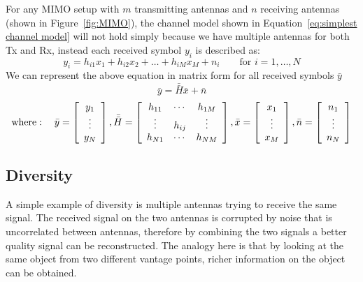 For any MIMO setup with $m$ transmitting antennas and $n$ receiving antennas (shown in Figure~\ref{fig:MIMO}), the channel model shown in Equation~\ref{eq:simplest channel model} will not hold simply because we have multiple antennas for both Tx and Rx, instead each received symbol $y_i$ is described as:
\begin{equation}
    \label{eq:y_i MIMO}
    y_i = h_{i1} x_1 + h_{i2} x_2 + \ldots + h_{iM} x_M + n_i \qquad \text{for } i=1,\ldots,N
\end{equation}
We can represent the above equation in matrix form for all received symbols $\bar{y}$
\begin{equation}
    \label{eq:y_bar MIMO}
    \bar{y} = \bar{\bar{H}} \bar{x} + \bar{n}
\end{equation}
\[ \text{where}: \quad \bar{y} = \left[ \begin{array}{c}
    y_1 \\
    \vdots \\
    y_N
\end{array} \right] , \bar{\bar{H}} = \left[ \begin{array}{c c c}
    h_{11} & \cdots & h_{1M} \\
    \vdots & h_{ij} & \vdots \\
    h_{N1} & \cdots & h_{NM}
\end{array} \right] , \bar{x} = \left[ \begin{array}{c}
    x_1 \\
    \vdots \\
    x_M
\end{array} \right] , \bar{n} = \left[ \begin{array}{c}
    n_1 \\
    \vdots \\
    n_N     
\end{array} \right] \]

\subsection{Diversity}
\label{subsection:MIMO-Diversity}
A simple example of diversity is multiple antennas trying to receive the same signal. The received signal on the two antennas is corrupted by noise that is uncorrelated between antennas, therefore by combining the two signals a better quality signal can be reconstructed. The analogy here is that by looking at the same object from two different vantage points, richer information on the object can be obtained.

